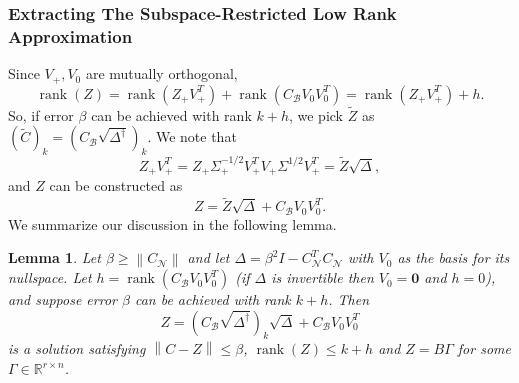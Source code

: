 \documentclass[11pt]{article}
\newcommand{\RR}{\mathbb{R}}
\newcommand{\rank}{\operatorname{rank}}
\newtheorem{lemma}[theorem]{Lemma}
\renewcommand{\math}[1]{$#1$}
\newcommand{\norm}[1]{\left\|#1\right\|}
\newcommand{\B}{\mathcal{B}}
\newcommand{\N}{\mathcal{N}}
\newcommand{\G}{\Gamma}
\newcommand{\0}{\ensuremath{\mathbf{0}}}
\renewcommand{\>}{\succ}
\newcommand{\<}{\prec}
\begin{document}
\subsubsection{Extracting The Subspace-Restricted Low Rank Approximation}
Since \math{V_+,V_0} are mutually orthogonal,
$$\rank(Z)=\rank(Z_+V_+^T)+\rank(C_{\B}V_0V_0^T)=\rank(Z_+V_+^T)+h.$$
So, if error \math{\beta} can be achieved with rank 
\math{k+h}, we pick $\tilde Z$ as $(\tilde C)_k = (C_{\B}\sqrt{\Delta^{\dagger}} )_k$.  We note that 
\[ Z_+ V_+ ^T = Z_+ {\Sigma}^{-1/2}_+V_+ ^T V_+ \Sigma^{1/2} V_+ ^T = \tilde Z \sqrt{\Delta},  \]
and $Z$ can be constructed as
\[ Z = \tilde Z \sqrt{\Delta} + C_{\B} V_0 V_0 ^T. \]
We summarize our discussion in the following lemma.
\begin{lemma}\label{achievable}
Let \math{\beta\ge\norm{C_{\N}}} and let \math{\Delta=\beta^2I-C_{\N}^TC_{\N}} with
\math{V_0} as the basis for its nullspace. Let 
\math{h=\rank(C_{\B}V_0V_0^T)} (if \math{\Delta} is invertible then
\math{V_0=\bm0} and \math{h=0}), and suppose error \math{\beta} can be achieved with 
rank \math{k+h}.
Then 
$$
Z=(C_{\B} \sqrt{\Delta^{\dagger}})_k \sqrt{\Delta} +C_{\B}V_0V_0^T
$$
is a solution satisfying \math{\norm{C-Z}\le\beta}, 
\math{\rank(Z)\le k+h} and \math{Z=B \G} for some \math{\G\in\RR^{r\times n}}.
\end{lemma}
\end{document}
